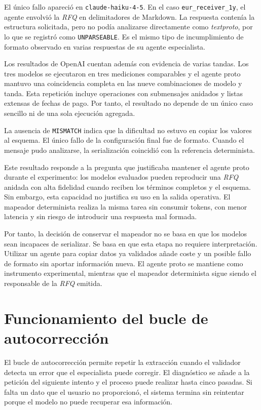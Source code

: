 El único fallo apareció en \texttt{claude-haiku-4-5}. En el caso \texttt{eur\_receiver\_1y}, el agente envolvió la \textit{RFQ} en delimitadores de Markdown. La respuesta contenía la estructura solicitada, pero no podía analizarse directamente como \textit{textproto}, por lo que se registró como \texttt{UNPARSEABLE}. Es el mismo tipo de incumplimiento de formato observado en varias respuestas de su agente especialista.

Los resultados de OpenAI cuentan además con evidencia de varias tandas. Los tres modelos se ejecutaron en tres mediciones comparables y el agente proto mantuvo una coincidencia completa en las nueve combinaciones de modelo y tanda. Esta repetición incluye operaciones con submensajes anidados y listas extensas de fechas de pago. Por tanto, el resultado no depende de un único caso sencillo ni de una sola ejecución agregada.

La ausencia de \texttt{MISMATCH} indica que la dificultad no estuvo en copiar los valores al esquema. El único fallo de la configuración final fue de formato. Cuando el mensaje pudo analizarse, la serialización coincidió con la referencia determinista.

Este resultado responde a la pregunta que justificaba mantener el agente proto durante el experimento: los modelos evaluados pueden reproducir una \textit{RFQ} anidada con alta fidelidad cuando reciben los términos completos y el esquema. Sin embargo, esta capacidad no justifica su uso en la salida operativa. El mapeador determinista realiza la misma tarea sin consumir tokens, con menor latencia y sin riesgo de introducir una respuesta mal formada.

Por tanto, la decisión de conservar el mapeador no se basa en que los modelos sean incapaces de serializar. Se basa en que esta etapa no requiere interpretación. Utilizar un agente para copiar datos ya validados añade coste y un posible fallo de formato sin aportar información nueva. El agente proto se mantiene como instrumento experimental, mientras que el mapeador determinista sigue siendo el responsable de la \textit{RFQ} emitida.


\section{Funcionamiento del bucle de autocorrección}
\label{sec:bucle_autocorreccion}

El bucle de autocorrección permite repetir la extracción cuando el validador detecta un error que el especialista puede corregir. El diagnóstico se añade a la petición del siguiente intento y el proceso puede realizar hasta cinco pasadas. Si falta un dato que el usuario no proporcionó, el sistema termina sin reintentar porque el modelo no puede recuperar esa información.


